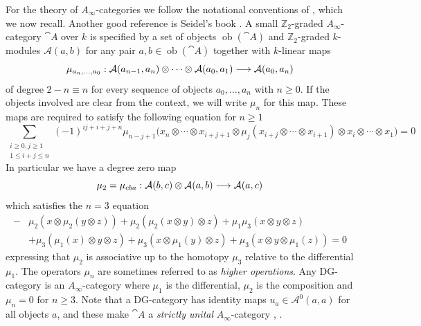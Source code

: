 \documentclass[english,letter paper,12pt,leqno]{article}
\theoremstyle{example}
\numberwithin{equation}{section}
\def\AA{\mathcal{A}}
\def\be{\begin{equation}}
\def\ee{\end{equation}}
\def\nZ{\mathds{Z}}
\begin{document}
For the theory of $A_\infty$-categories we follow the notational conventions of \cite[\S 2]{lazaroiu}, which we now recall. Another good reference is Seidel's book \cite{seidel}. A small $\nZ_2$-graded $A_\infty$-category $\cat{A}$ over $k$ is specified by a set of objects $\operatorname{ob}(\cat{A})$ and $\nZ_2$-graded $k$-modules $\AA(a,b)$ for any pair $a,b \in \operatorname{ob}(\cat{A})$ together with $k$-linear maps
\[
\mu_{a_n,\ldots,a_0}: \AA(a_{n-1}, a_n) \otimes \cdots \otimes \AA(a_0, a_1) \lto \AA(a_0,a_n)
\]
of degree $2 - n \equiv n$ for every sequence of objects $a_0,\ldots,a_n$ with $n \ge 0$. If the objects involved are clear from the context, we will write $\mu_n$ for this map. These maps are required to satisfy the following equation for $n \ge 1$
\be\label{eq_ainf_constraints}
\sum_{\substack{i \ge 0, j \ge 1 \\ 1 \le i + j \le n}} (-1)^{ij + i + j + n} \mu_{n-j+1}\Big( x_n \otimes \cdots \otimes x_{i+j+1} \otimes \mu_j( x_{i+j} \otimes \cdots \otimes x_{i+1} ) \otimes x_i \otimes \cdots \otimes x_1 \Big) = 0
\ee
In particular we have a degree zero map
\[
\mu_2 = \mu_{cba}: \AA(b,c) \otimes \AA(a,b) \lto \AA(a,c)
\]
which satisfies the $n = 3$ equation
\begin{align*}
- &\mu_2( x \otimes \mu_2( y \otimes z ) ) + \mu_2( \mu_2( x \otimes y ) \otimes z ) + \mu_1 \mu_3( x \otimes y \otimes z )\\
& + \mu_3( \mu_1(x) \otimes y \otimes z ) + \mu_3( x \otimes \mu_1(y) \otimes z ) + \mu_3( x \otimes y \otimes \mu_1(z) ) = 0
\end{align*}
expressing that $\mu_2$ is associative up to the homotopy $\mu_3$ relative to the differential $\mu_1$. The operators $\mu_n$ are sometimes referred to as \emph{higher operations}. Any DG-category is an $A_\infty$-category where $\mu_1$ is the differential, $\mu_2$ is the composition and $\mu_n = 0$ for $n \ge 3$. Note that a DG-category has identity maps $u_a \in \AA^0(a,a)$ for all objects $a$, and these make $\cat{A}$ a \emph{strictly unital} $A_\infty$-category \cite[\S 2.1]{lazaroiu}, \cite[\S I.2]{seidel}.
\end{document}
